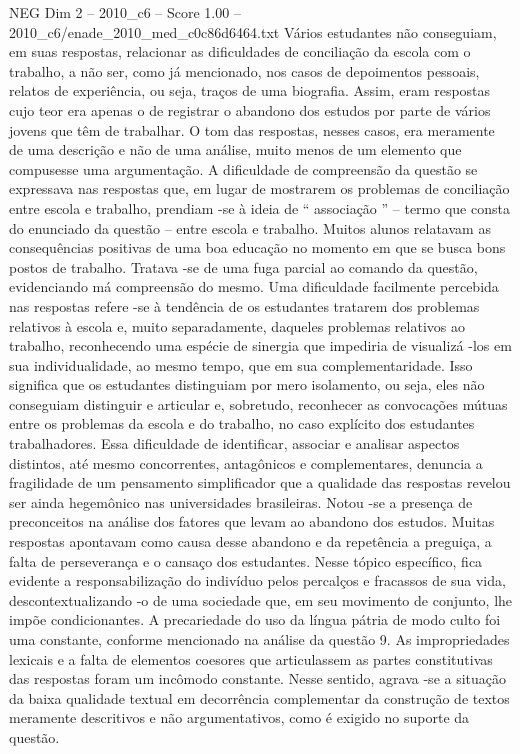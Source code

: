 \begin{textsample}{NEG Dim 2 – 2010\_c6 – Score 1.00 – 2010\_c6/enade\_2010\_med\_c0c86d6464.txt}
Vários estudantes não conseguiam, em suas respostas, relacionar as dificuldades de conciliação da escola com o trabalho, a não ser, como já mencionado, nos casos de depoimentos pessoais, relatos de experiência, ou seja, traços de uma biografia.
Assim, eram respostas cujo teor era apenas o de registrar o abandono dos estudos por parte de vários jovens que têm de trabalhar.
O tom das respostas, nesses casos, era meramente de uma descrição e não de uma análise, muito menos de um elemento que compusesse uma argumentação.
A dificuldade de compreensão da questão se expressava nas respostas que, em lugar de mostrarem os problemas de conciliação entre escola e trabalho, prendiam -se à ideia de “ associação ” – termo que consta do enunciado da questão – entre escola e trabalho.
Muitos alunos relatavam as consequências positivas de uma boa educação no momento em que se busca bons postos de trabalho.
Tratava -se de uma fuga parcial ao comando da questão, evidenciando má compreensão do mesmo.
Uma dificuldade facilmente percebida nas respostas refere -se à tendência de os estudantes tratarem dos problemas relativos à escola e, muito separadamente, daqueles problemas relativos ao trabalho, reconhecendo uma espécie de sinergia que impediria de visualizá -los em sua individualidade, ao mesmo tempo, que em sua complementaridade.
Isso significa que os estudantes distinguiam por mero isolamento, ou seja, eles não conseguiam distinguir e articular e, sobretudo, reconhecer as convocações mútuas entre os problemas da escola e do trabalho, no caso explícito dos estudantes trabalhadores.
Essa dificuldade de identificar, associar e analisar aspectos distintos, até mesmo concorrentes, antagônicos e complementares, denuncia a fragilidade de um pensamento simplificador que a qualidade das respostas revelou ser ainda hegemônico nas universidades brasileiras.
Notou -se a presença de preconceitos na análise dos fatores que levam ao abandono dos estudos.
Muitas respostas apontavam como causa desse abandono e da repetência a preguiça, a falta de perseverança e o cansaço dos estudantes.
Nesse tópico específico, fica evidente a responsabilização do indivíduo pelos percalços e fracassos de sua vida, descontextualizando -o de uma sociedade que, em seu movimento de conjunto, lhe impõe condicionantes.
A precariedade do uso da língua pátria de modo culto foi uma constante, conforme mencionado na análise da questão 9.
As impropriedades lexicais e a falta de elementos coesores que articulassem as partes constitutivas das respostas foram um incômodo constante.
Nesse sentido, agrava -se a situação da baixa qualidade textual em decorrência complementar da construção de textos meramente descritivos e não argumentativos, como é exigido no suporte da questão.

\end{textsample}
